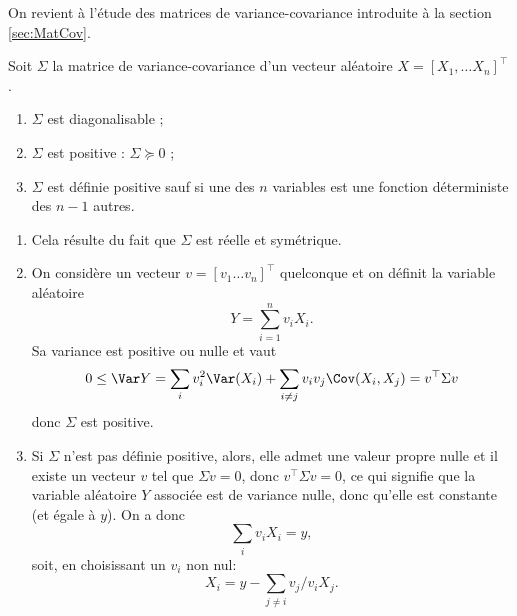On revient à l'étude des matrices de variance-covariance introduite à la section \ref{sec:MatCov}.

\begin{proposition}
  Soit $\Sigma$ la matrice de variance-covariance d'un vecteur aléatoire $X = [X_1, \dots X_n]^\top$.
  \begin{enumerate}
    \item $\Sigma$ est diagonalisable ;
    \item $\Sigma$ est positive : $\Sigma \succcurlyeq 0$ ;
    \item $\Sigma$ est définie positive sauf si une des $n$ variables est une fonction déterministe des $n-1$ autres.
  \end{enumerate}
\end{proposition}

\proof
\begin{enumerate}
\item Cela résulte du fait que $\Sigma$ est réelle et symétrique.
\item On considère un vecteur $v = [v_1 \dots v_n]^\top$ quelconque et on définit la variable aléatoire 
$$
Y = \sum_{i=1}^n v_i X_i.
$$
Sa variance est positive ou nulle et vaut
$$
0 \leq \Var Y 
= \sum_i v_i^2 \Var(X_i) + \sum_{i \neq j} v_i v_j \Cov(X_i, X_j)
= v^\top \Sigma v
$$
donc $\Sigma$ est positive.
\item Si $\Sigma$  n'est pas définie positive, alors, elle admet une valeur propre nulle et il existe un vecteur $v$ tel que $\Sigma v = 0$, donc $v^\top \Sigma v = 0$, ce qui signifie que la variable aléatoire $Y$ associée est de variance nulle, donc qu'elle est constante (et égale à $y$). On a donc
$$
\sum_i v_i X_i = y,
$$
soit, en choisissant un $v_i$ non nul: 
$$
X_i = y - \sum_{j \neq i} v_j/v_i X_j.
$$
\end{enumerate}
\eproof


